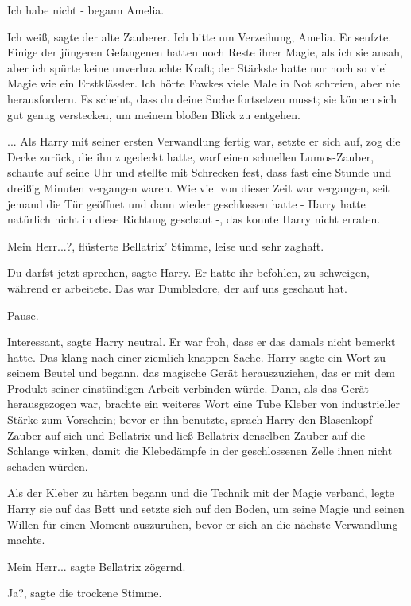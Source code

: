 \glqq{}Ich habe nicht -\grqq{} begann Amelia.

\glqq{}Ich weiß\grqq{}, sagte der alte Zauberer. \glqq{}Ich bitte um Verzeihung,
Amelia.\grqq{} Er seufzte. \glqq{}Einige der jüngeren Gefangenen hatten noch Reste
ihrer Magie, als ich sie ansah, aber ich spürte keine unverbrauchte Kraft; der
Stärkste hatte nur noch so viel Magie wie ein Erstklässler. Ich hörte Fawkes
viele Male in Not schreien, aber nie herausfordern. Es scheint, dass du deine
Suche fortsetzen musst; sie können sich gut genug verstecken, um meinem bloßen
Blick zu entgehen.\grqq{}

... Als Harry mit seiner ersten Verwandlung fertig war, setzte er sich auf, zog
die Decke zurück, die ihn zugedeckt hatte, warf einen schnellen Lumos-Zauber,
schaute auf seine Uhr und stellte mit Schrecken fest, dass fast eine Stunde und
dreißig Minuten vergangen waren. Wie viel von dieser Zeit war vergangen, seit
jemand die Tür geöffnet und dann wieder geschlossen hatte - Harry hatte
natürlich nicht in diese Richtung geschaut -, das konnte Harry nicht erraten.

\glqq{}Mein Herr...?\grqq{}, flüsterte Bellatrix' Stimme, leise und sehr zaghaft.

\glqq{}Du darfst jetzt sprechen\grqq{}, sagte Harry. Er hatte ihr befohlen, zu
schweigen, während er arbeitete. \glqq{}Das war Dumbledore, der auf uns geschaut
hat.\grqq{}

Pause.

\glqq{}Interessant\grqq{}, sagte Harry neutral. Er war froh, dass er das damals
nicht bemerkt hatte. Das klang nach einer ziemlich knappen Sache. Harry sagte
ein Wort zu seinem Beutel und begann, das magische Gerät herauszuziehen, das er
mit dem Produkt seiner einstündigen Arbeit verbinden würde. Dann, als das Gerät
herausgezogen war, brachte ein weiteres Wort eine Tube Kleber von industrieller
Stärke zum Vorschein; bevor er ihn benutzte, sprach Harry den Blasenkopf-Zauber
auf sich und Bellatrix und ließ Bellatrix denselben Zauber auf die Schlange
wirken, damit die Klebedämpfe in der geschlossenen Zelle ihnen nicht schaden
würden.

Als der Kleber zu härten begann und die Technik mit der Magie verband, legte
Harry sie auf das Bett und setzte sich auf den Boden, um seine Magie und seinen
Willen für einen Moment auszuruhen, bevor er sich an die nächste Verwandlung
machte.

\glqq{}Mein Herr...\grqq{} sagte Bellatrix zögernd.

\glqq{}Ja?\grqq{}, sagte die trockene Stimme.

